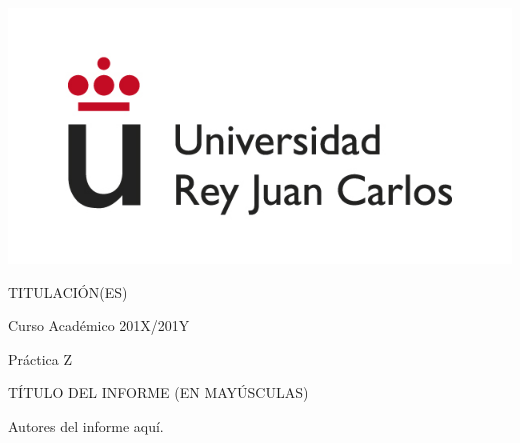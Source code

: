 \documentclass[a4paper, 12pt]{book}
\begin{document}
	\begin{titlepage}
		\centering
		\includegraphics[scale=0.5]{img/logo_urjc.jpg}
		\vspace{3cm}
		
		\Large
		TITULACIÓN(ES)
		
		\vspace{0.4cm}
		
		\large
		Curso Académico 201X/201Y
		
		\vspace{0.8cm}
		
		Práctica Z
		
		\vspace{2.5cm}		
		\LARGE		
		
		TÍTULO DEL INFORME (EN MAYÚSCULAS)

		\vspace{2.5 cm}
		
		\large
		Autores del informe aquí.
		\afterpage{\null\newpage}
		\pagestyle{empty}
	\end{titlepage}
	
	\tableofcontents
	\setcounter{page}{1}
	\mainmatter
	
	
	
	
	
	
	
	
	
	
	
	
\end{document}
